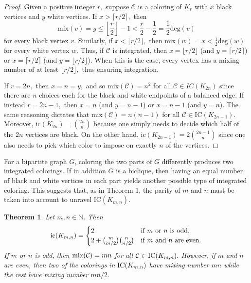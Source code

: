 \documentclass[11pt, reqno]{amsart}
\newtheorem{theorem}{Theorem} %
\theoremstyle{definition}
\renewcommand{\leq}{\leqslant}
\begin{document}
\begin{proof}
Given a positive integer $r,$ suppose $\mathcal{C}$ is a coloring of $K_r$ with $x$ black vertices and $y$ white vertices. If $x > \lceil r/2\rceil,$ then
\[\text{mix}(v) = y \leq \left\lfloor \frac{r}{2} \right\rfloor - 1 < \frac{r}{2}-\frac{1}{2}=\frac{1}{2}\text{deg}(v)\]
for every black vertex $v.$ Similarly, if $x < \lfloor r/2 \rfloor,$ then $\text{mix}(w) = x < \frac{1}{2}\text{deg}(w)$ for every white vertex $w.$ Thus, if $\mathcal{C}$ is integrated, then $x = \lfloor r/2 \rfloor$ (and $y = \lceil r/2 \rceil$) or $x = \lceil r/2 \rceil$ (and $y = \lfloor r/2 \rfloor$). When this is the case, every vertex has a mixing number of at least $\lfloor r/2 \rfloor,$ thus ensuring integration.

If $r = 2n,$ then $x = n = y,$ and so $\text{mix}(\mathcal{C}) = n^2$ for all $\mathcal{C} \in IC(K_{2n})$ since there are $n$ choices each for the black and white endpoints of a balanced edge. If instead $r = 2n - 1,$ then $x = n$ (and $y = n - 1$) or $x = n - 1$ (and $y = n$). The same reasoning dictates that $\text{mix}(\mathcal{C}) = n(n-1)$ for all $\mathcal{C} \in \text{IC}(K_{2n-1}).$ Moreover, $\text{ic}(K_{2n}) = \binom{2n}{n}$ because one simply needs to decide which half of the $2n$ vertices are black. On the other hand, $\text{ic}(K_{2n-1}) = 2\binom{2n-1}{n}$ since one also needs to pick which color to impose on exactly $n$ of the vertices.
\end{proof}

For a bipartite graph $G$, coloring the two parts of $G$ differently produces two integrated colorings. If in addition $G$ is a biclique, then having an equal number of black and white vertices in each part yields another possible type of integrated coloring. This suggests that, as in Theorem 1, the parity of $m$ and $n$ must be taken into account to unravel $\text{IC}(K_{m,n}).$

\begin{theorem}
Let $m, n \in \mathbb{N}.$ Then
\[\textup{ic}(K_{m,n}) = \begin{cases}
  2 & \text{if $m$ or $n$ is odd,}  \\
  2+ \binom{m}{m/2}\binom{n}{n/2} & \text{if $m$ and $n$ are even.}
\end{cases}\]
If $m$ or $n$ is odd, then $\textup{mix}(\mathcal{C}) = mn$ for all $\mathcal{C} \in \textup{IC}(K_{m,n}).$ However, if $m$ and $n$ are even, then two of the colorings in $\textup{IC}(K_{m,n})$ have mixing number $mn$ while the rest have mixing number $mn/2.$ 
\end{theorem}
\end{document}
